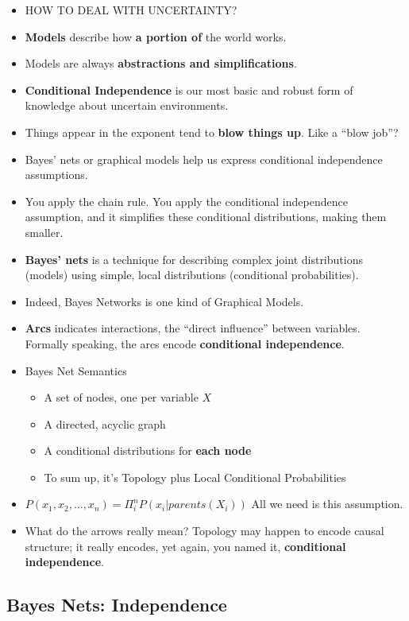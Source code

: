 \documentclass[twocolumn]{article}
\begin{document}
\begin{itemize}
\item HOW TO DEAL WITH UNCERTAINTY?\@
\item \textbf{Models} describe how \textbf{a portion of} the world
  works.
\item Models are always \textbf{abstractions and simplifications}.
\item \textbf{Conditional Independence} is our most basic and robust
  form of knowledge about uncertain environments.
\item Things appear in the exponent tend to \textbf{blow things
    up}. Like a ``blow job''?
\item Bayes' nets or graphical models help us express conditional
  independence assumptions.
\item You apply the chain rule. You apply the conditional independence
  assumption, and it simplifies these conditional distributions,
  making them smaller.
\item \textbf{Bayes' nets} is a technique for describing complex joint
  distributions (models) using simple, local distributions
  (conditional probabilities).
\item Indeed, Bayes Networks is one kind of Graphical Models.
\item \textbf{Arcs} indicates interactions, the ``direct influence''
  between variables. Formally speaking, the arcs encode
  \textbf{conditional independence}.
\item Bayes Net Semantics
  \begin{itemize}
  \item A set of nodes, one per variable $X$
  \item A directed, acyclic graph
  \item A conditional distributions for \textbf{each node}
  \item To sum up, it's Topology plus Local Conditional Probabilities
  \end{itemize}
\item $P(x_{1},x_{2},\ldots,x_{n})={\displaystyle\Pi^ {n}_
    {i}}P(x_{i}|parents(X_{i}))$  All we need is this assumption.
\item What do the arrows really mean? Topology may happen to encode
  causal structure; it really encodes, yet again, you named it,
  \textbf{conditional independence}.
\end{itemize}

\subsection{Bayes Nets: Independence}
\label{sec:bayes-nets:-indep}
\end{document}
